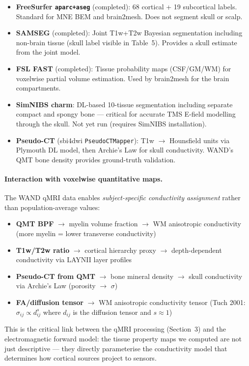 \documentclass[11pt,a4paper]{article}\usepackage[]{graphicx}\usepackage[]{xcolor}
\begin{document}
\begin{itemize}
  \item \textbf{FreeSurfer \texttt{aparc+aseg}} (completed): 68 cortical +
    19 subcortical labels. Standard for MNE BEM and brain2mesh.
    Does not segment skull or scalp.
  \item \textbf{SAMSEG} (completed): Joint T1w+T2w Bayesian segmentation
    including non-brain tissue (skull label visible in Table~5). Provides
    a skull estimate from the joint model.
  \item \textbf{FSL FAST} (completed): Tissue probability maps
    (CSF/GM/WM) for voxelwise partial volume estimation. Used by
    brain2mesh for the brain compartments.
  \item \textbf{SimNIBS charm}: DL-based 10-tissue segmentation
    including separate compact and spongy bone --- critical for
    accurate TMS E-field modelling through the skull. Not yet run
    (requires SimNIBS installation).
  \item \textbf{Pseudo-CT} (sbi4dwi \texttt{PseudoCTMapper}): T1w $\to$
    Hounsfield units via Plymouth DL model, then Archie's Law for
    skull conductivity. WAND's QMT bone density provides ground-truth
    validation.
\end{itemize}

\paragraph{Interaction with voxelwise quantitative maps.}
The WAND qMRI data enables \emph{subject-specific conductivity
assignment} rather than population-average values:
\begin{itemize}
  \item \textbf{QMT BPF} $\to$ myelin volume fraction $\to$ WM anisotropic
    conductivity (more myelin = lower transverse conductivity)
  \item \textbf{T1w/T2w ratio} $\to$ cortical hierarchy proxy $\to$
    depth-dependent conductivity via LAYNII layer profiles
  \item \textbf{Pseudo-CT from QMT} $\to$ bone mineral density $\to$
    skull conductivity via Archie's Law (porosity $\to$ $\sigma$)
  \item \textbf{FA/diffusion tensor} $\to$ WM anisotropic conductivity
    tensor (Tuch 2001: $\sigma_{ij} \propto d_{ij}^s$ where $d_{ij}$
    is the diffusion tensor and $s \approx 1$)
\end{itemize}

This is the critical link between the qMRI processing (Section~3)
and the electromagnetic forward model: the tissue property maps
we computed are not just descriptive --- they directly parameterise
the conductivity model that determines how cortical sources project
to sensors.
\end{document}
